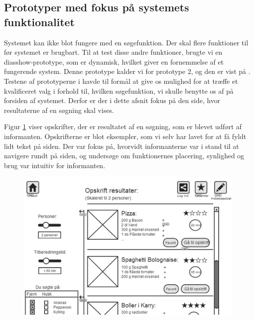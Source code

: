 \subsection{Prototyper med fokus på systemets funktionalitet}
\label{subsec:prototype2}

Systemet kan ikke blot fungere med en søgefunktion. Der skal flere funktioner til før systemet er brugbart. Til at test disse andre funktioner, brugte vi en diasshow-prototype, som er dynamisk, hvilket giver en fornemmelse af et fungerende system. Denne prototype kalder vi for prototype 2, og den er vist på . Testene af prototyperne i  havde til formål at give os mulighed for at træffe et kvalificeret valg i forhold til, hvilken søgefunktion, vi skulle benytte os af på forsiden af systemet. Derfor er der i dette afsnit fokus på den side, hvor resultaterne af en søgning skal vises.

Figur \ref{fig:prototype2design} viser opskrifter, der er resultatet af en søgning, som er blevet udført af informanten. Opskrifterne er blot eksempler, som vi selv har lavet for at få fyldt lidt tekst på siden. Der var fokus på, hvorvidt informanterne var i stand til at navigere rundt på siden, og undersøge om funktionernes placering, synlighed og brug var intuitiv for informanten.

\begin{figure}[H]
	\centering
	\includegraphics[scale=0.7]{billeder/prototyper/prototype2.png}
	\label{fig:prototype2design}
\end{figure}

